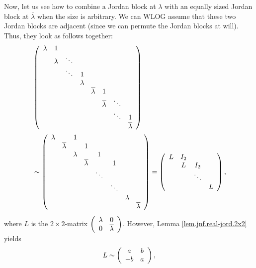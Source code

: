 \documentclass[numbers=enddot,12pt,final,onecolumn,notitlepage]{scrartcl}%
\numberwithin{exer}{subsection}
\theoremstyle{definition}
\begin{document}
Now, let us see how to combine a Jordan block at $\lambda$ with an equally
sized Jordan block at $\overline{\lambda}$ when the size is arbitrary. We can
WLOG assume that these two Jordan blocks are adjacent (since we can permute
the Jordan blocks at will). Thus, they look as follows together:%
\begin{align*}
&  \left(
\begin{array}
[c]{cccccccc}%
\lambda & 1 &  &  &  &  &  & \\
& \lambda & \ddots &  &  &  &  & \\
&  & \ddots & 1 &  &  &  & \\
&  &  & \lambda &  &  &  & \\
&  &  &  & \overline{\lambda} & 1 &  & \\
&  &  &  &  & \overline{\lambda} & \ddots & \\
&  &  &  &  &  & \ddots & 1\\
&  &  &  &  &  &  & \overline{\lambda}%
\end{array}
\right) \\
&  \sim\left(
\begin{array}
[c]{cccccccc}%
\lambda &  & 1 &  &  &  &  & \\
& \overline{\lambda} &  & 1 &  &  &  & \\
&  & \lambda &  & 1 &  &  & \\
&  &  & \overline{\lambda} &  & 1 &  & \\
&  &  &  & \ddots &  &  & \\
&  &  &  &  & \ddots &  & \\
&  &  &  &  &  & \lambda & \\
&  &  &  &  &  &  & \overline{\lambda}%
\end{array}
\right)  =\left(
\begin{array}
[c]{cccc}%
L & I_{2} &  & \\
& L & I_{2} & \\
&  & \ddots & \\
&  &  & L
\end{array}
\right)  ,
\end{align*}
where $L$ is the $2\times2$-matrix $\left(
\begin{array}
[c]{cc}%
\lambda & 0\\
0 & \overline{\lambda}%
\end{array}
\right)  $. However, Lemma \ref{lem.jnf.real-jord.2x2} yields%
\[
L\sim\left(
\begin{array}
[c]{cc}%
a & b\\
-b & a
\end{array}
\right)  ,
\]
\end{document}
